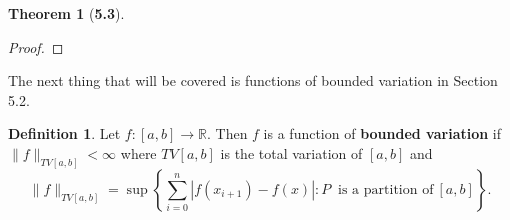 \documentclass[12pt]{article}
\newcommand{\R}{\mathbb{R}}
\theoremstyle{definition}
\newtheorem*{thm}{Theorem}
\newtheorem*{definition}{Definition}
\begin{document}
\begin{thm}[\textbf{5.3}]
\begin{proof}
        \end{proof}
The next thing that will be covered is functions of bounded variation in Section 5.2.

\begin{definition}
    Let \( f: [a,b ]\to \R  \). Then \( f \) is a function of \textbf{bounded variation} if \( \lVert f \rVert_{TV[a,b]} < \infty \) where \( TV[a,b] \) is the total variation of \( [a,b] \) and
        \[
            \lVert f \rVert_{TV[a,b]} = \sup \left\{ \sum_{i=0}^{n} |f(x_{i+1}) - f(x)| : P \ \text{ is a partition of}\ [a,b] \right\}.
        \]
\end{definition}

\end{thm}
\end{document}
